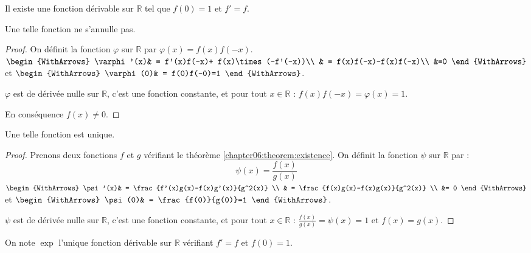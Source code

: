\documentclass[main.tex]{subfiles}
\begin{document}
\begin{theorem}\label{chapter06:theorem:existence} Il existe une fonction dérivable sur $\mathbb{R}$ tel que $f(0)=1$ et $f'=f$.
\end{theorem}
\begin{proposition} Une telle fonction ne s'annulle pas.	
\end{proposition}
\begin{proof} On définit la fonction $\varphi$ sur $\mathbb{R}$ par $\varphi(x)=f(x)f(-x)$.\\
$\begin{WithArrows}
	\varphi'(x)& = f'(x)f(-x)+ f(x)\times (-f'(-x))\\
	& = f(x)f(-x)-f(x)f(-x)\\
	&=0
	\end{WithArrows}$ et 
$\begin{WithArrows}
	\varphi(0)& = f(0)f(-0)=1
\end{WithArrows}$. 

$\varphi$ est de dérivée nulle sur $\mathbb{R}$, c'est une fonction constante, et pour tout $x\in \mathbb{R}$ : $f(x)f(-x)=\varphi(x)=1$.

En conséquence $f(x)\neq 0$.
\end{proof}
\begin{proposition}\label{chapter06:proposition:unicite}  Une telle fonction est unique.	
\end{proposition}
\begin{proof} Prenons deux fonctions $f$ et $g$ vérifiant le théorème \ref{chapter06:theorem:existence}. On définit la fonction $\psi$ sur $\mathbb{R}$ par :
	\setlength{\abovedisplayskip}{3pt}
	\setlength{\belowdisplayskip}{3pt}
	$$\psi(x)=\frac{f(x)}{g(x)}$$
$\begin{WithArrows}
	\psi'(x)& = \frac{f'(x)g(x)-f(x)g'(x)}{g^2(x)} \\
	& =  \frac{f(x)g(x)-f(x)g(x)}{g^2(x)} \\
	&= 0 
\end{WithArrows}$ et 
$\begin{WithArrows}
	\psi(0)& = \frac{f(0)}{g(0)}=1
\end{WithArrows}$.
	
	$\psi$ est de dérivée nulle sur $\mathbb{R}$, c'est une fonction constante, et pour tout $x\in \mathbb{R}$ : $\frac{f(x)}{g(x)}=\psi(x)=1$ et $f(x)=g(x)$.
\end{proof}
\begin{definition}[notation 1] On note \og $\exp$ \fg l'unique fonction dérivable sur $\mathbb{R}$ vérifiant $f'=f$ et $f(0)=1$.
\end{definition}
\end{document}
